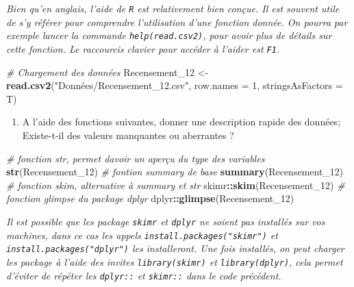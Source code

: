 \documentclass[
]{article}
\newenvironment{Shaded}{\begin{snugshade}}{\end{snugshade}}
\newcommand{\AttributeTok}[1]{\textcolor[rgb]{0.13,0.29,0.53}{#1}}
\newcommand{\CommentTok}[1]{\textcolor[rgb]{0.56,0.35,0.01}{\textit{#1}}}
\newcommand{\DecValTok}[1]{\textcolor[rgb]{0.00,0.00,0.81}{#1}}
\newcommand{\FunctionTok}[1]{\textcolor[rgb]{0.13,0.29,0.53}{\textbf{#1}}}
\newcommand{\NormalTok}[1]{#1}
\newcommand{\OtherTok}[1]{\textcolor[rgb]{0.56,0.35,0.01}{#1}}
\newcommand{\SpecialCharTok}[1]{\textcolor[rgb]{0.81,0.36,0.00}{\textbf{#1}}}
\newcommand{\StringTok}[1]{\textcolor[rgb]{0.31,0.60,0.02}{#1}}
\providecommand{\tightlist}{%
  \setlength{\itemsep}{0pt}\setlength{\parskip}{0pt}}
\begin{document}
\emph{Bien qu'en anglais, l'aide de \texttt{R} est relativement bien
conçue. Il est souvent utile de s'y référer pour comprendre
l'utilisation d'une fonction donnée. On pourra par exemple lancer la
commande \texttt{help(read.csv2)}, pour avoir plus de détails sur cette
fonction. Le raccourcis clavier pour accéder à l'aider est \texttt{F1}.}

\begin{Shaded}
\begin{Highlighting}[]
\CommentTok{\# Chargement des données}
\NormalTok{Recensement\_12 }\OtherTok{\textless{}{-}} \FunctionTok{read.csv2}\NormalTok{(}\StringTok{"Données/Recensement\_12.csv"}\NormalTok{, }\AttributeTok{row.names =} \DecValTok{1}\NormalTok{, }\AttributeTok{stringsAsFactors =}\NormalTok{ T)}
\end{Highlighting}
\end{Shaded}

\begin{enumerate}
\def\labelenumi{\arabic{enumi}.}
\setcounter{enumi}{4}
\tightlist
\item
  A l'aide des fonctions suivantes, donner une description rapide des
  données; Existe-t-il des valeurs manquantes ou aberrantes ?
\end{enumerate}

\begin{Shaded}
\begin{Highlighting}[]
\CommentTok{\# fonction str, permet d\textquotesingle{}avoir un aperçu du type des variables}
\FunctionTok{str}\NormalTok{(Recensement\_12)}
\CommentTok{\# fontion summary de base}
\FunctionTok{summary}\NormalTok{(Recensement\_12)}
\CommentTok{\# fonction skim, alternative à summary et str}
\NormalTok{skimr}\SpecialCharTok{::}\FunctionTok{skim}\NormalTok{(Recensement\_12)}
\CommentTok{\# fonction glimpse du package dplyr}
\NormalTok{dplyr}\SpecialCharTok{::}\FunctionTok{glimpse}\NormalTok{(Recensement\_12)}
\end{Highlighting}
\end{Shaded}

\emph{Il est possible que les package \texttt{skimr} et \texttt{dplyr}
ne soient pas installés sur vos machines, dans ce cas les appels
\texttt{install.packages("skimr")} et \texttt{install.packages("dplyr")}
les installeront. Une fois installés, on peut charger les package à
l'aide des invites \texttt{library(skimr)} et \texttt{library(dplyr)},
cela permet d'éviter de répéter les \texttt{dplyr::} et \texttt{skimr::}
dans le code précédent.}
\end{document}
